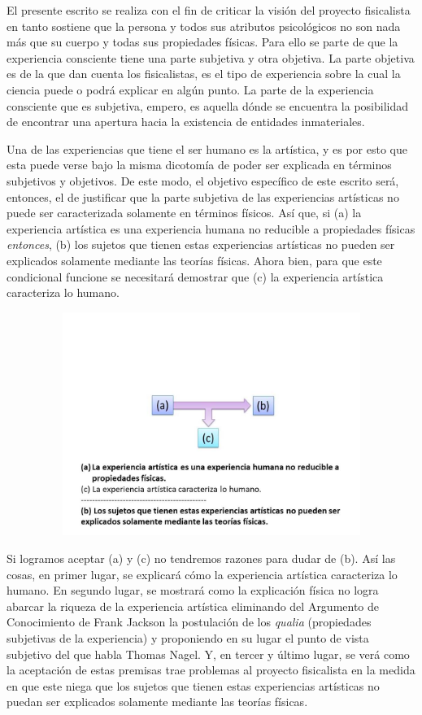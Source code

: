 \documentclass[]{book}
\begin{document}
El presente escrito se realiza con el fin de criticar la visión del
proyecto fisicalista en tanto sostiene que la persona y todos sus
atributos psicológicos no son nada más que su cuerpo y todas sus
propiedades físicas. Para ello se parte de que la experiencia consciente
tiene una parte subjetiva y otra objetiva. La parte objetiva es de la
que dan cuenta los fisicalistas, es el tipo de experiencia sobre la cual
la ciencia puede o podrá explicar en algún punto. La parte de la
experiencia consciente que es subjetiva, empero, es aquella dónde se
encuentra la posibilidad de encontrar una apertura hacia la existencia
de entidades inmateriales.

Una de las experiencias que tiene el ser humano es la artística, y es
por esto que esta puede verse bajo la misma dicotomía de poder ser
explicada en términos subjetivos y objetivos. De este modo, el objetivo
específico de este escrito será, entonces, el de justificar que la parte
subjetiva de las experiencias artísticas no puede ser caracterizada
solamente en términos físicos. Así que, si (a) la experiencia artística
es una experiencia humana no reducible a propiedades físicas
\emph{entonces}, (b) los sujetos que tienen estas experiencias
artísticas no pueden ser explicados solamente mediante las teorías
físicas. Ahora bien, para que este condicional funcione se necesitará
demostrar que (c) la experiencia artística caracteriza lo humano.

\begin{center}
	\includegraphics[width=5.76744in,height=2.86101in]{media/image2.png}

\end{center}

Si logramos aceptar (a) y (c) no tendremos razones para dudar de (b).
Así las cosas, en primer lugar, se explicará cómo la experiencia
artística caracteriza lo humano. En segundo lugar, se mostrará como la
explicación física no logra abarcar la riqueza de la experiencia
artística eliminando del Argumento de Conocimiento de Frank Jackson la
postulación de los \emph{qualia} (propiedades subjetivas de la
experiencia) y proponiendo en su lugar el punto de vista subjetivo del
que habla Thomas Nagel. Y, en tercer y último lugar, se verá como la
aceptación de estas premisas trae problemas al proyecto fisicalista en
la medida en que este niega que los sujetos que tienen estas
experiencias artísticas no puedan ser explicados solamente mediante las
teorías físicas.
\end{document}
